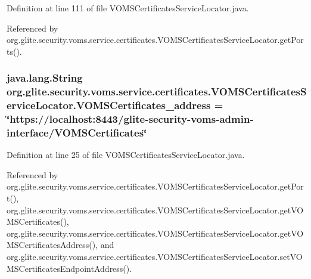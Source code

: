 Definition at line 111 of file VOMSCertificatesServiceLocator.java.



Referenced by org.glite.security.voms.service.certificates.VOMSCertificatesServiceLocator.getPorts().

\hypertarget{classorg_1_1glite_1_1security_1_1voms_1_1service_1_1certificates_1_1VOMSCertificatesServiceLocator_a371d66d2ede092a1af9636928c221103}{
\subsubsection[{VOMSCertificates\_\-address}]{\setlength{\rightskip}{0pt plus 5cm}java.lang.String {\bf org.glite.security.voms.service.certificates.VOMSCertificatesServiceLocator.VOMSCertificates\_\-address} = \char`\"{}https://localhost:8443/glite-\/security-\/voms-\/admin-\/interface/{\bf VOMSCertificates}\char`\"{}}}
\label{classorg_1_1glite_1_1security_1_1voms_1_1service_1_1certificates_1_1VOMSCertificatesServiceLocator_a371d66d2ede092a1af9636928c221103}


Definition at line 25 of file VOMSCertificatesServiceLocator.java.



Referenced by org.glite.security.voms.service.certificates.VOMSCertificatesServiceLocator.getPort(), org.glite.security.voms.service.certificates.VOMSCertificatesServiceLocator.getVOMSCertificates(), org.glite.security.voms.service.certificates.VOMSCertificatesServiceLocator.getVOMSCertificatesAddress(), and org.glite.security.voms.service.certificates.VOMSCertificatesServiceLocator.setVOMSCertificatesEndpointAddress().

